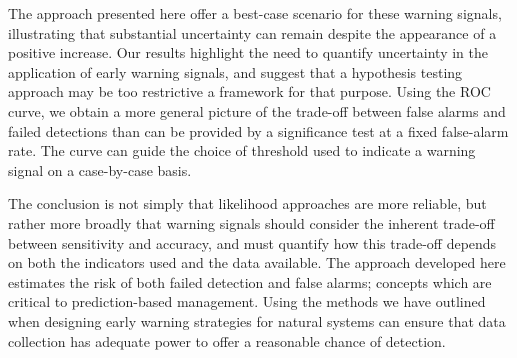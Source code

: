 \documentclass{pnastwo}
\begin{document}
\begin{article}

The approach presented here offer a best-case scenario for these warning signals,
illustrating that substantial uncertainty can remain despite the appearance of a positive increase.
Our results highlight the need to quantify uncertainty in the application of early warning signals,
and suggest that a hypothesis testing approach may be too restrictive a framework for that purpose.
Using the ROC curve, we obtain a more general picture of the trade-off between false alarms and failed detections
than can be provided by a significance test at a fixed false-alarm rate.  
The curve can guide the choice of threshold used to indicate a warning signal on a case-by-case basis.  


The conclusion is not simply that likelihood approaches are more reliable, 
but rather more broadly that warning signals should consider
the inherent trade-off between sensitivity and accuracy,
and must quantify how this trade-off depends on both the indicators used and the data available.  
The approach developed here estimates the risk of both failed detection and false alarms;
concepts which are critical to prediction-based management.  
Using the methods we have outlined when designing early warning strategies for natural systems
can ensure that data collection has adequate power to offer a reasonable chance of detection. 



                             \begin{materials}

\end{materials}
\end{article}
\end{document}
